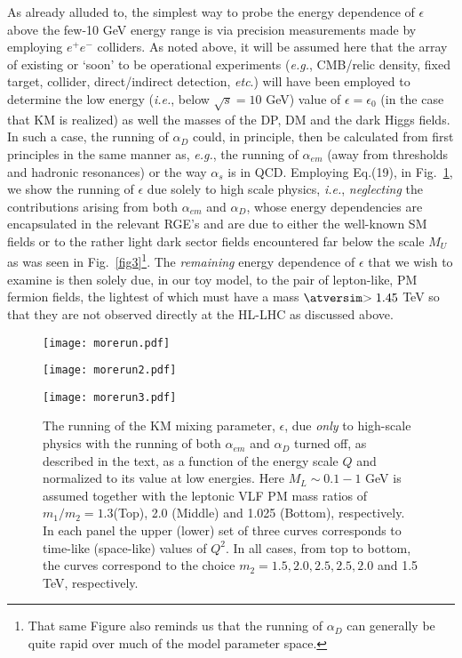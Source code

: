 \documentclass[14pt]{article}
\def\ie{{\it i.e.}}
\def\eg{{\it e.g.}}
\def\etc{{\it etc}}
\def\matth{\mathsurround=0pt}
\def\gsim{\mathrel{\mathpalette\atversim>}}
\def\atversim#1#2{\lower0.7ex\vbox{\baselineskip\zatskip\lineskip\zatskip
  \lineskiplimit 0pt\ialign{$\matth#1\hfil##\hfil$\crcr#2\crcr\sim\crcr}}}
\begin{document}
{As already alluded to, the simplest way to probe the energy dependence of $\epsilon$ above the few-10 GeV energy range is via precision measurements made by employing 
$e^+e^-$ colliders. As noted above, it will be assumed here that the array of existing or `soon'  to be operational experiments (\eg, CMB/relic density, fixed target, collider, direct/indirect 
detection, \etc.) will have been employed to determine the low energy (\ie, below $\sqrt s=10$ GeV) value of $\epsilon=\epsilon_0$ (in the case that KM is realized) as well the masses of the DP, 
DM and the dark Higgs fields.  In such a case, the running of $\alpha_D$ could, in principle, then be calculated from first principles in the same manner as, \eg, the running of $\alpha_{em}$ (away 
from thresholds 
and hadronic resonances) or the way $\alpha_s$ is in QCD. Employing Eq.(19), in Fig.~\ref{fig4}, we show the running of $\epsilon$ due solely to high scale physics, \ie, {\it neglecting} the contributions 
arising from both $\alpha_{em}$ and $\alpha_D$, whose energy dependencies are encapsulated in the relevant RGE's and are due to either the well-known SM fields or to the rather light dark sector 
fields encountered far below 
the scale $M_U$ as was seen in Fig.~\ref{fig3}{\footnote {That same Figure also reminds us that the running of $\alpha_D$ can generally be quite rapid over much of the model parameter space.}}. 
The {\it remaining} energy dependence of $\epsilon$ that we wish to examine is then solely due, in our toy model, to the pair of lepton-like, PM fermion fields, the lightest of which must have a mass 
$\gsim 1.45$ TeV so that they are not observed directly at the HL-LHC as discussed above. 

%
\begin{figure}[htbp]
\centerline{\texttt{[image: morerun.pdf]}}
\vspace*{-1.8cm}
\centerline{\texttt{[image: morerun2.pdf]}}
\vspace*{-1.8cm}
\centerline{\texttt{[image: morerun3.pdf]}}
\vspace*{-1.1cm}
\caption{The running of the KM mixing parameter, $\epsilon$, due {\it only} to high-scale physics with the running of both $\alpha_{em}$ and $\alpha_D$ turned off, as described in the text, as a function 
of the energy scale $Q$ and normalized to its value at low energies. Here $M_L\sim 0.1-1$ GeV is assumed together with the leptonic VLF PM mass ratios of $m_1/m_2=1.3$(Top), 2.0 (Middle) and 
1.025 (Bottom), respectively. In each panel the upper (lower) set of three curves corresponds to time-like (space-like) values of $Q^2$. In all cases, from top to bottom, the curves 
correspond to the choice $m_2=1.5,2.0,2.5,2.5,2.0$ and 1.5 TeV, respectively.}
\label{fig4}
\end{figure}
%

}
\end{document}
